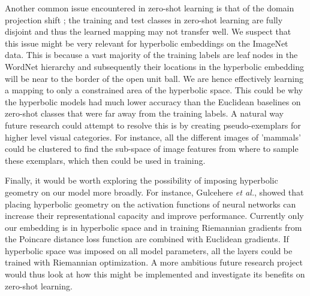 \documentclass[12pt]{report}
\begin{document}
Another common issue encountered in zero-shot learning is that of the domain projection shift \cite{Fu2015}; the training and test classes in zero-shot learning are fully disjoint and thus the learned mapping may not transfer well. We suspect that this issue might be very relevant for hyperbolic embeddings on the ImageNet data. This is because a vast majority of the training labels are leaf nodes in the WordNet hierarchy and subsequently their locations in the hyperbolic embedding will be near to the border of the open unit ball. We are hence effectively learning a mapping to only a constrained area of the hyperbolic space. This could be why the hyperbolic models had much lower accuracy than the Euclidean baselines on zero-shot classes that were far away from the training labels. A natural way future research could attempt to resolve this is by creating pseudo-exemplars for higher level visual categories. For instance, all the different images of 'mammals' could be clustered to find the sub-space of image features from where to sample these exemplars, which then could be used in training.

Finally, it would be worth exploring the possibility of imposing hyperbolic geometry on our model more broadly. For instance, Gulcehere \textit{et al.}, showed that placing hyperbolic geometry on the activation functions of neural networks can increase their representational capacity and improve performance. Currently only our embedding is in hyperbolic space and in training Riemannian gradients from the Poincare distance loss function are combined with Euclidean gradients. If hyperbolic space was imposed on all model parameters, all the layers could be trained with Riemannian optimization. A more ambitious future research project would thus look at how this might be implemented and investigate its benefits on zero-shot learning.



\end{document}
